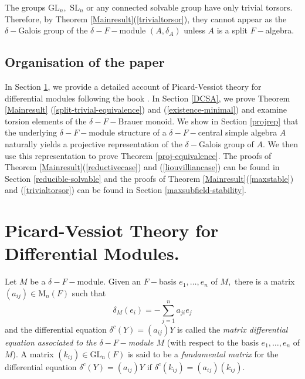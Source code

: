 \documentclass[preprint, 11pt]{amsart}
\theoremstyle{corollary}
\theoremstyle{remark}
\theoremstyle{proposition}
\numberwithin{equation}{subsection}
\begin{document}
The groups $\mathrm{GL}_n,$ $\mathrm{SL}_n$ or any  connected solvable group have only  trivial torsors. Therefore, by Theorem \ref{Mainresult}(\ref{trivialtorsor}), they cannot appear as the $\delta-$Galois group of the $\delta-F-$module $(A, \delta_A)$  unless $A$ is a split $F-$algebra.


\subsection{Organisation of the paper} In Section \ref{pvtheory}, we provide a detailed account of Picard-Vessiot theory for differential modules following the book \cite{MvdP03}.  In Section \ref{DCSA}, we prove Theorem \ref{Mainresult} (\ref{split-trivial-equivalence}) and (\ref{existence-minimal}) and examine torsion elements of the $\delta-F-$Brauer monoid. We show in Section \ref{projrep} that the underlying $\delta-F-$module structure of a $\delta-F-$central simple algebra $A$ naturally yields a  projective representation of the $\delta-$Galois group of $A.$ We then use this representation to prove Theorem \ref{proj-equivalence}. The proofs of Theorem \ref{Mainresult}(\ref{reductivecase}) and (\ref{liouvilliancase}) can be found in Section \ref{reducible-solvable} and the proofs of Theorem \ref{Mainresult}(\ref{maxstable}) and (\ref{trivialtorsor}) can be found in Section \ref{maxsubfield-stability}.

	
	\section{Picard-Vessiot Theory for Differential Modules.}\label{pvtheory}



Let $M$ be a $\delta-F-$module.  Given an $F-$basis $e_1,\dots, e_n$ of $M,$ there is a matrix $(a_{ij})\in \mathrm{M}_n(F)$ such that $$\delta_M(e_i)=-\sum^n_{j=1}a_{ji} e_j$$ and the differential equation $\delta^c(Y)=(a_{ij})Y$ is called the \emph{matrix differential equation associated to the $\delta-F-$module $M$} (with respect to the basis $e_1,\dots, e_n$ of $M$).   A matrix $(k_{ij})\in\mathrm{GL}_n(F)$ is said to be a \emph{fundamental matrix} for the differential equation $\delta^c(Y)=(a_{ij})Y$ if $\delta^c\left(k_{ij}\right)=(a_{ij})(k_{ij}).$ 
	
\end{document}

